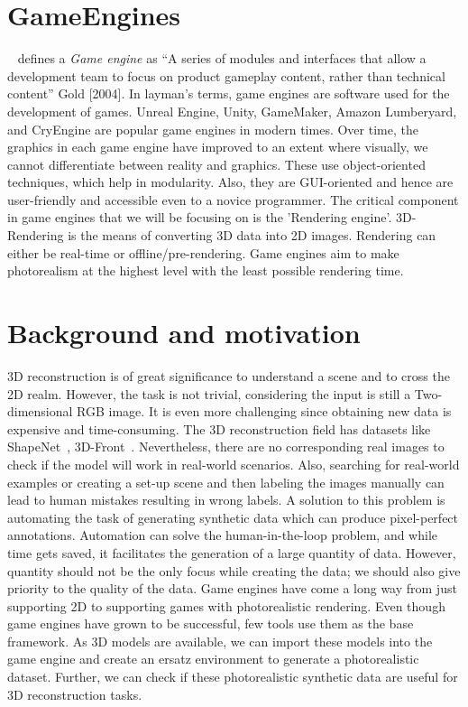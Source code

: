 \section{GameEngines}\label{sec:gameengines}
~\cite{10.5555/983334} defines a \emph{Game engine} as  “A series of modules and interfaces that allow a development team to focus on product gameplay content,
rather than technical content” Gold [2004].
In layman’s terms, game engines are software used for the development of games.
Unreal Engine, Unity, GameMaker, Amazon Lumberyard, and CryEngine are popular game engines in modern times.
Over time, the graphics in each game engine have improved to an extent where visually, we cannot differentiate between reality and graphics.
These use object-oriented techniques, which help in modularity.
Also, they are GUI-oriented and hence are user-friendly and accessible even to a novice programmer.
The critical component in game engines that we will be focusing on is the ’Rendering engine’.
3D-Rendering is the means of converting 3D data into 2D images.
Rendering can either be real-time or offline/pre-rendering.
Game engines aim to make photorealism at the highest level with the least possible rendering time.


\section{Background and motivation}\label{sec:Background and motivation}

3D reconstruction is of great significance to understand a scene and to cross the 2D realm.
However, the task is not trivial, considering the input is still a Two-dimensional RGB image.
It is even more challenging since obtaining new data is expensive and time-consuming.
The 3D reconstruction field has datasets like ShapeNet~\cite{chang2015shapenet}, 3D-Front~\cite{Fu20203DFRONT3F}.
Nevertheless, there are no corresponding real images to check if the model will work in real-world scenarios.
Also, searching for real-world examples or creating a set-up scene and then labeling the images manually can lead to human mistakes resulting in wrong labels.
A solution to this problem is automating the task of generating synthetic data which can produce pixel-perfect annotations.
Automation can solve the human-in-the-loop problem, and while time gets saved, it facilitates the generation of a large quantity of data.
However, quantity should not be the only focus while creating the data;
we should also give priority to the quality of the data.
Game engines have come a long way from just supporting 2D to supporting games with photorealistic rendering.
Even though game engines have grown to be successful, few tools use them as the base framework.
As 3D models are available, we can import these models into the game engine and create an ersatz environment to generate a photorealistic dataset.
Further, we can check if these photorealistic synthetic data are useful for 3D reconstruction tasks.


